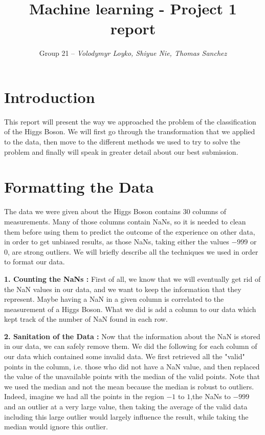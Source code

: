 \documentclass[10pt,conference,compsocconf]{IEEEtran}
\begin{document}
\title{Machine learning - Project 1 report}
\author{Group 21 -- \textit{Volodymyr Loyko, Shiyue Nie, Thomas Sanchez}}

\maketitle

\section{Introduction}
This report will present the way we approached the problem of the classification of the Higgs Boson. We will first go through the transformation that we applied to the data, then move to the different methods we used to try to solve the problem and finally will speak in greater detail about our best submission.
\section{Formatting the Data}
The data we were given about the Higgs Boson contains 30 columns of measurements. Many of those columns contain NaNs, so it is needed to clean them before using them to predict the outcome of the experience on other data, in order to get unbiased results, as those NaNs, taking either the values $-999$ or $0$, are strong outliers. We will briefly describe all the techniques we used in order to format our data.

\textbf{1. Counting the NaNs :} First of all, we know that we will eventually get rid of the NaN values in our data, and we want to keep the information that they represent. Maybe having a NaN in a given column is correlated to the measurement of a Higgs Boson. What we did is add a column to our data which kept track of the number of NaN found in each row.

\textbf{2. Sanitation of the Data :} Now that the information about the NaN is stored in our data, we can safely remove them. We did the following for each column of our data which contained some invalid data. We first retrieved all the "valid" points in the column, i.e. those who did not have a NaN value, and then replaced the value of the unavailable points with the median of the valid points.  Note that we used the median and not the mean because the median is robust to outliers. Indeed, imagine we had all the points in the region $-1$ to $1$,the NaNs to $-999$ and an outlier at a very large value, then taking the average of the valid data including this large outlier would largely influence the result, while taking the median would ignore this outlier. 
\end{document}
